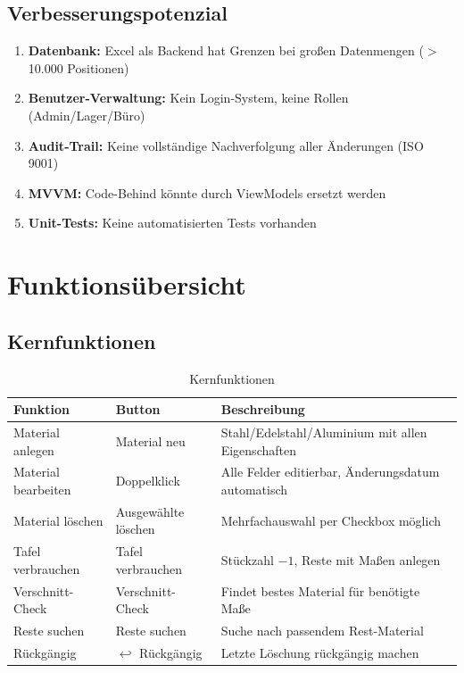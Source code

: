 \documentclass[a4paper,12pt]{article}
\begin{document}
\subsection{Verbesserungspotenzial}

\begin{enumerate}
    \item \textbf{Datenbank:} Excel als Backend hat Grenzen bei großen Datenmengen ($>$10.000 Positionen)
    \item \textbf{Benutzer-Verwaltung:} Kein Login-System, keine Rollen (Admin/Lager/Büro)
    \item \textbf{Audit-Trail:} Keine vollständige Nachverfolgung aller Änderungen (ISO 9001)
    \item \textbf{MVVM:} Code-Behind könnte durch ViewModels ersetzt werden
    \item \textbf{Unit-Tests:} Keine automatisierten Tests vorhanden
\end{enumerate}

\section{Funktionsübersicht}

\subsection{Kernfunktionen}

\begin{table}[h]
\centering
\begin{tabularx}{\textwidth}{l l X}
\toprule
\textbf{Funktion} & \textbf{Button} & \textbf{Beschreibung} \\
\midrule
Material anlegen & Material neu & Stahl/Edelstahl/Aluminium mit allen Eigenschaften \\
Material bearbeiten & Doppelklick & Alle Felder editierbar, Änderungsdatum automatisch \\
Material löschen & Ausgewählte löschen & Mehrfachauswahl per Checkbox möglich \\
Tafel verbrauchen & Tafel verbrauchen & Stückzahl $-1$, Reste mit Maßen anlegen \\
Verschnitt-Check & Verschnitt-Check & Findet bestes Material für benötigte Maße \\
Reste suchen & Reste suchen & Suche nach passendem Rest-Material \\
Rückgängig & $\hookleftarrow$ Rückgängig & Letzte Löschung rückgängig machen \\
\bottomrule
\end{tabularx}
\caption{Kernfunktionen}
\end{table}
\end{document}
